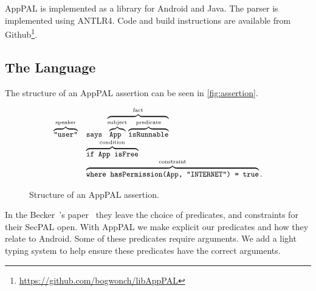 \documentclass[]{llncs}
\begin{document}
AppPAL is implemented as a library for Android and Java.
The parser is implemented using ANTLR4.
Code and build instructions are available from Github\footnote{\url{https://github.com/bogwonch/libAppPAL}}.

\subsection{The Language}
\label{ssec:language}

The structure of an AppPAL assertion can be seen in \autoref{fig:assertion}.

\begin{figure}
  \centering
  \begin{equation*}\small
    \begin{array}{r l}
      \overbrace{\text{\ttfamily "user"}}^{\text{speaker}} &
      \text{\ttfamily says }\overbrace{\overbrace{\text{\ttfamily App }}^{\text{subject}}\overbrace{\text{\ttfamily isRunnable}}^{\text{predicate}}}^{\text{fact}} \\
      & \overbrace{\text{\ttfamily if App isFree}}^{\text{condition}} \\
      & \overbrace{\text{\ttfamily where hasPermission(App, "INTERNET") = true}}^{\text{constraint}}.
    \end{array}
  \end{equation*}
  \caption{Structure of an AppPAL assertion.}
\label{fig:assertion}
\end{figure}

In the Becker~\etal's paper~\cite{Becker:2006vh} they leave the choice of predicates, and constraints for their SecPAL open.
With AppPAL we make explicit our predicates and how they relate to Android.
Some of these predicates require arguments.
We add a light typing system to help ensure these predicates have the correct arguments.
\end{document}
